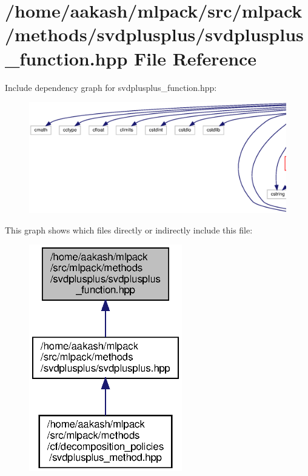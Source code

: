\section{/home/aakash/mlpack/src/mlpack/methods/svdplusplus/svdplusplus\+\_\+function.hpp File Reference}
\label{svdplusplus__function_8hpp}
Include dependency graph for svdplusplus\+\_\+function.\+hpp\+:
\nopagebreak
\begin{figure}[H]
\begin{center}
\leavevmode
\includegraphics[width=350pt]{svdplusplus__function_8hpp__incl}
\end{center}
\end{figure}
This graph shows which files directly or indirectly include this file\+:
\nopagebreak
\begin{figure}[H]
\begin{center}
\leavevmode
\includegraphics[width=189pt]{svdplusplus__function_8hpp__dep__incl}
\end{center}
\end{figure}
